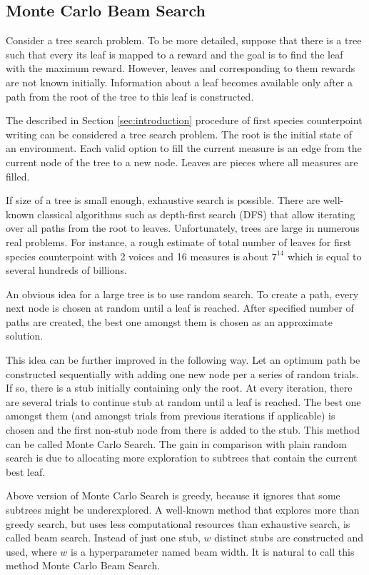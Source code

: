 \documentclass{article}
\begin{document}
\subsection{Monte Carlo Beam Search}
\label{subsec:montecarlo}

Consider a tree search problem. To be more detailed, suppose that there is a tree such that every its leaf is mapped to a reward and the goal is to find the leaf with the maximum reward. However, leaves and corresponding to them rewards are not known initially. Information about a leaf becomes available only after a path from the root of the tree to this leaf is constructed.

The described in Section \ref{sec:introduction} procedure of first species counterpoint writing can be considered a tree search problem. The root is the initial state of an environment. Each valid option to fill the current measure is an edge from the current node of the tree to a new node. Leaves are pieces where all measures are filled. 

If size of a tree is small enough, exhaustive search is possible. There are well-known classical algorithms such as depth-first search (DFS) that allow iterating over all paths from the root to leaves. Unfortunately, trees are large in numerous real problems. For instance, a rough estimate of total number of leaves for first species counterpoint with 2 voices and 16 measures is about $7^{14}$ which is equal to several hundreds of billions.

An obvious idea for a large tree is to use random search. To create a path, every next node is chosen at random until a leaf is reached. After specified number of paths are created, the best one amongst them is chosen as an approximate solution.

This idea can be further improved in the following way. Let an optimum path be constructed sequentially with adding one new node per a series of random trials. If so, there is a stub initially containing only the root. At every iteration, there are several trials to continue stub at random until a leaf is reached. The best one amongst them (and amongst trials from previous iterations if applicable) is chosen and the first non-stub node from there is added to the stub. This method can be called Monte Carlo Search. The gain in comparison with plain random search is due to allocating more exploration to subtrees that contain the current best leaf.

Above version of Monte Carlo Search is greedy, because it ignores that some subtrees might be underexplored. A well-known method that explores more than greedy search, but uses less computational resources than exhaustive search, is called beam search. Instead of just one stub, $w$ distinct stubs are constructed and used, where $w$ is a hyperparameter named beam width. It is natural to call this method Monte Carlo Beam Search.
\end{document}
